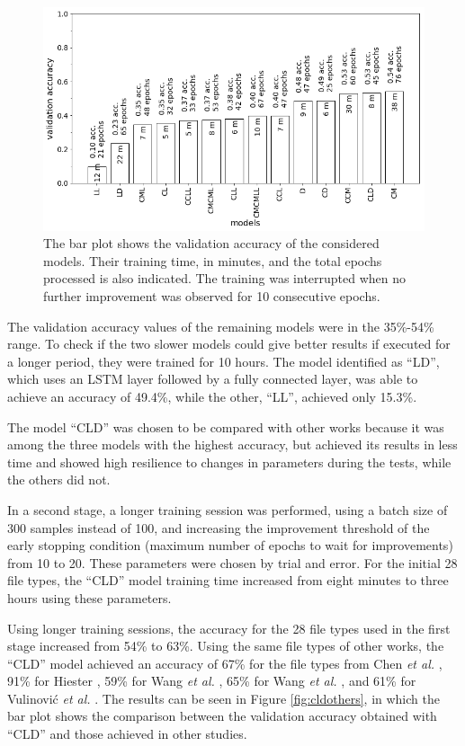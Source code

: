 \begin{figure}[htb!]
\centering\includegraphics[width=1.0\textwidth]{content/models.png}
\caption[Validation accuracy of models]{\label{fig:models}The bar plot shows the validation accuracy of the considered models. Their training time, in minutes, and the total epochs processed is also indicated. The training was interrupted when no further improvement was observed for 10 consecutive epochs.}%
\end{figure}

The validation accuracy values of the remaining models were in the 35\%-54\% range.
To check if the two slower models could give better results if executed for a longer period, they were trained for 10 hours. The model identified as ``LD'', which uses an LSTM layer followed by a fully connected layer, was able to achieve an accuracy of 49.4\%, while the other, ``LL'', achieved only 15.3\%.

The model ``CLD'' was chosen to be compared with other works because it was among the three models with the highest accuracy, but achieved its results in less time and showed high resilience to changes in parameters during the tests, while the others did not.

In a second stage, a longer training session was performed, using a batch size of 300 samples instead of 100, and increasing the improvement threshold of the early stopping condition (maximum number of epochs to wait for improvements) from 10 to 20. These parameters were chosen by trial and error. For the initial 28 file types, the ``CLD'' model training time increased from eight minutes to three hours using these parameters.

Using longer training sessions, the accuracy for the 28 file types used in the first stage increased from 54\% to 63\%. Using the same file types of other works, the ``CLD'' model achieved an accuracy of 
67\% for the file types from Chen \textit{et al.} \cite{chen_file_2018},
91\% for Hiester \cite{hiester_file_2018}, 
59\% for Wang \textit{et al.} \cite{wang_sparse_2018},
65\% for Wang \textit{et al.} \cite{wang_file_2018},
and
61\% for Vulinović \textit{et al.} \cite{vulinovic_neural_2019}.
The results can be seen in Figure \ref{fig:cldothers}, in which the bar plot shows the comparison between the validation accuracy obtained with ``CLD'' and those achieved in other studies.

